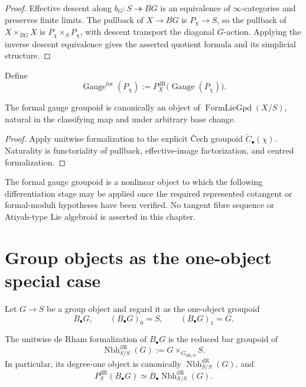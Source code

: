 \begin{proof}
Effective descent along $b_G:S\twoheadrightarrow BG$ is an equivalence of
$\infty$-categories and preserves finite limits.  The pullback of
$X\to BG$ is $P_\chi\to S$, so the pullback of
$X\times_{BG}X$ is $P_\chi\times_SP_\chi$, with descent transport the
diagonal $G$-action.  Applying the inverse descent equivalence gives the
asserted quotient formula and its simplicial structure.
\end{proof}

\begin{definition}
\label{def:formal-gauge-groupoid}
Define
\[
    \operatorname{Gauge}^{\mathrm{for}}(P_\chi)
    :=
    P_X^{\mathrm{dR}}\bigl(\operatorname{Gauge}(P_\chi)\bigr).
\]
\end{definition}

\begin{proposition}
\label{prop:gauge-formal-lie-groupoid}
The formal gauge groupoid is canonically an object of
$\operatorname{FormLieGpd}(X/S)$, natural in the classifying map and under
arbitrary base change.
\end{proposition}

\begin{proof}
Apply unitwise formalization to the explicit \v{C}ech groupoid
$\check C_\bullet(\chi)$.  Naturality is functoriality of pullback,
effective-image factorization, and centred formalization.
\end{proof}

\begin{remark}
The formal gauge groupoid is a nonlinear object to which the following
differentiation stage may be applied once the required represented cotangent or
formal-moduli hypotheses have been verified.  No tangent fibre sequence or
Atiyah-type Lie algebroid is asserted in this chapter.
\end{remark}

\section{Group objects as the one-object special case}
\label{sec:flg-one-object-groups}

Let $G\to S$ be a group object and regard it as the one-object groupoid
\[
    B_\bullet G,
    \qquad
    (B_\bullet G)_0=S,
    \qquad
    (B_\bullet G)_1=G.
\]

\begin{theorem}
\label{thm:one-object-formalization}
The unitwise de Rham formalization of $B_\bullet G$ is the reduced bar groupoid of
\[
    \operatorname{Nbh}^{\mathrm{dR}}_{S/S}(G)
    :=
    G\times_{G_{\mathrm{dR}/S}}S.
\]
In particular, its degree-one object is canonically
\(\operatorname{Nbh}^{\mathrm{dR}}_{S/S}(G)\), and
\[
    P_S^{\mathrm{dR}}(B_\bullet G)
    \simeq
    B_\bullet\operatorname{Nbh}^{\mathrm{dR}}_{S/S}(G).
\]
\end{theorem}

